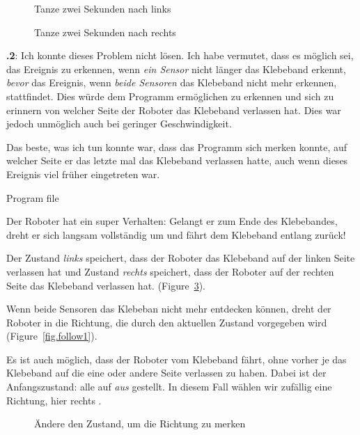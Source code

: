 \documentclass[12pt,a4paper,english]{article}
\begin{document}
\begin{figure}
\begin{center}
\caption{Tanze zwei Sekunden nach links}\label{fig.dance-left}
\end{center}
\end{figure}

\begin{figure}
\begin{center}
\caption{Tanze zwei Sekunden nach rechts}\label{fig.dance-right}
\end{center}
\end{figure}

\textbf{\thesection.2}:
Ich konnte dieses Problem nicht lösen. Ich habe vermutet, dass es möglich sei, das Ereignis zu erkennen, wenn \emph{ein Sensor} nicht länger das Klebeband erkennt, \emph{bevor} das Ereignis, wenn \emph{beide Sensoren} das Klebeband nicht mehr erkennen, stattfindet. Dies würde dem Programm ermöglichen zu erkennen und sich zu erinnern von welcher Seite der Roboter das Klebeband verlassen hat. Dies war jedoch unmöglich auch bei geringer Geschwindigkeit.

Das beste, was ich tun konnte war, dass das Programm sich merken konnte, auf welcher Seite er das letzte mal das Klebeband verlassen hatte, auch wenn dieses Ereignis viel früher eingetreten war.

{\raggedleft \hfill Program file }

Der Roboter hat ein super Verhalten: Gelangt er zum Ende des Klebebandes, dreht er sich langsam vollständig um und fährt dem Klebeband entlang zurück! 

Der Zustand \emph{links}  speichert, dass der Roboter das Klebeband auf der linken Seite verlassen hat und Zustand \emph{rechts}  speichert, dass der Roboter auf der rechten Seite das Klebeband verlassen hat. (Figure~\ref{fig.follow3}).

Wenn beide Sensoren das Klebeban nicht mehr entdecken können, dreht der Roboter in die Richtung, die durch den aktuellen Zustand vorgegeben wird (Figure~\ref{fig.follow1}).

Es ist auch möglich, dass der Roboter vom Klebeband fährt, ohne vorher je das Klebeband auf die eine oder andere Seite verlassen zu haben. Dabei ist der Anfangszustand: alle auf \emph{aus} gestellt. In diesem Fall wählen wir zufällig eine Richtung, hier rechts .

\begin{figure}
\begin{center}
\caption{Ändere den Zustand, um die Richtung zu merken}\label{fig.follow3}
\end{center}
\end{figure}
\end{document}
